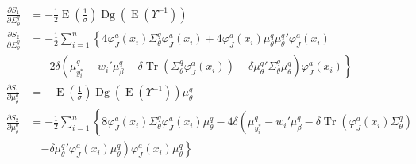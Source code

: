 \documentclass[11pt]{article}
\DeclareMathOperator{\Tr}{Tr}
\newcommand{\opn}{\operatorname}
\begin{document}
  \begin{align*}
    \frac{\partial S_{1}}{\partial \Sigma_{\theta}^{q}} &= -\frac{1}{2}\opn{E}\left(\frac{1}{\sigma}\right)\opn{Dg}\left(\opn{E}\left(\Upsilon^{-1}\right)\right)\\
    \frac{\partial S_{2}}{\partial \Sigma_{\theta}^{q}} &= -\frac{1}{2} \sum_{i=1}^{n}\left\{4\varphi_{J}^{a}\left(x_{i}\right)\Sigma_{\theta}^{q}\varphi_{J}^{a}\left(x_{i}\right) + 4\varphi_{J}^{a}\left(x_{i}\right)\mu_{\theta}^{q}{\mu_{\theta}^{q}}'\varphi_{J}^{a}\left(x_{i}\right) \right.\\
    &\quad \left. -2\delta\left(\mu_{y_{i}^{*}}^{q}-w_{i}'\mu_{\beta}^{q}-\delta \Tr\left(\Sigma_{\theta}^{q}\varphi_{J}^{a}\left(x_{i}\right)\right) -\delta {\mu_{\theta}^{q}}'\Sigma_{\theta}^{q}\mu_{\theta}^{q}\right)\varphi_{J}^{a}\left(x_{i}\right)\right\}\\
    \frac{\partial S_{1}}{\partial \mu_{\theta}^{q}} &= -\opn{E}\left(\frac{1}{\sigma}\right) \opn{Dg}\left(\opn{E}\left(\Upsilon^{-1}\right)\right)\mu_{\theta}^{q}\\
    \frac{\partial S_{2}}{\partial \mu_{\theta}^{q}} &= -\frac{1}{2}\sum_{i=1}^{n}\left\{8\varphi_{J}^{a}\left(x_{i}\right)\Sigma_{\theta}^{q}\varphi_{J}^{a}\left(x_{i}\right)\mu_{\theta}^{q} -4\delta\left(\mu_{y_{i}^{*}}^{q} -w_{i}'\mu_{\beta}^{q}-\delta \Tr\left(\varphi_{J}^{a}\left(x_{i}\right)\Sigma_{\theta}^{q}\right)\right. \right. \\
    &\quad \left.\left. -\delta{\mu_{\theta}^{q}}'\varphi_{J}^{a}\left(x_{i}\right)\mu_{\theta}^{q}\right)\varphi_{J}^{a}\left(x_{i}\right)\mu_{\theta}^{q}\right\}
  \end{align*}
\end{document}
